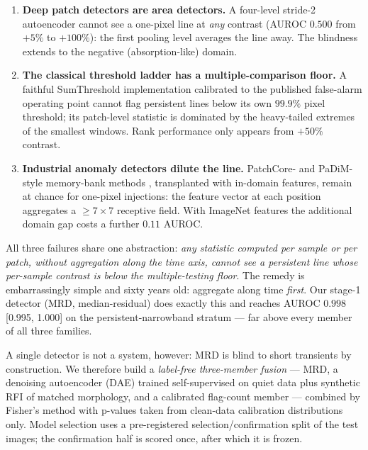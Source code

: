 \documentclass[journal]{IEEEtran}
\begin{document}
\begin{enumerate}
\item \textbf{Deep patch detectors are area detectors.}  A four-level
stride-2 autoencoder cannot see a one-pixel line at \emph{any} contrast
(AUROC $0.500$ from $+5\%$ to $+100\%$): the first pooling level averages
the line away.  The blindness extends to the negative (absorption-like)
domain.
\item \textbf{The classical threshold ladder has a multiple-comparison
floor.}  A faithful SumThreshold implementation
\cite{offringa2010} calibrated to the published false-alarm operating point
cannot flag persistent lines below its own $99.9\%$ pixel threshold; its
patch-level statistic is dominated by the heavy-tailed extremes of the
smallest windows.  Rank performance only appears from $+50\%$ contrast.
\item \textbf{Industrial anomaly detectors dilute the line.}  PatchCore- and
PaDiM-style memory-bank methods \cite{roth2022,defard2021}, transplanted with
in-domain features, remain at chance for one-pixel injections: the feature
vector at each position aggregates a $\ge 7\times7$ receptive field.
With ImageNet features the additional domain gap costs a further
$0.11$ AUROC.
\end{enumerate}

All three failures share one abstraction: \emph{any statistic computed per
sample or per patch, without aggregation along the time axis, cannot see a
persistent line whose per-sample contrast is below the multiple-testing
floor}.  The remedy is embarrassingly simple and sixty years old: aggregate
along time \emph{first}.  Our stage-1 detector (MRD, median-residual) does
exactly this and reaches AUROC $0.998$ [0.995, 1.000] on the
persistent-narrowband stratum --- far above every member of all three
families.

A single detector is not a system, however: MRD is blind to short transients
by construction.  We therefore build a \emph{label-free three-member fusion}
--- MRD, a denoising autoencoder (DAE) trained self-supervised on quiet data
plus synthetic RFI of matched morphology, and a calibrated flag-count member
--- combined by Fisher's method with p-values taken from clean-data
calibration distributions only.  Model selection uses a pre-registered
selection/confirmation split of the test images; the confirmation half is
scored once, after which it is frozen.
\end{document}
